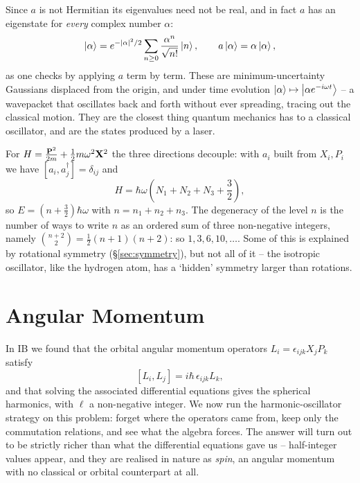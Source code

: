 \documentclass[a4paper]{scrartcl}
\begin{document}
\begin{remark}
    Since $a$ is not Hermitian its eigenvalues need not be real, and in fact $a$ has an eigenstate for \emph{every} complex number $\alpha$:
    $$
    \ket{\alpha} = e^{-\lvert\alpha\rvert^2/2}\sum_{n \geq 0}\frac{\alpha^n}{\sqrt{n!}}\ket{n}, \qquad a \ket{\alpha} = \alpha \ket{\alpha},
    $$
    as one checks by applying $a$ term by term. These  are minimum-uncertainty Gaussians displaced from the origin, and under time evolution $\ket{\alpha} \mapsto \ket{\alpha e^{-i\omega t}}$ -- a wavepacket that oscillates back and forth without ever spreading, tracing out the classical motion. They are the closest thing quantum mechanics has to a classical oscillator, and are the states produced by a laser.
\end{remark}

\begin{example}
    For $H = \frac{\mathbf{P}^2}{2m} + \frac12 m\omega^2 \mathbf{X}^2$ the three directions decouple: with $a_i$ built from $X_i, P_i$ we have $[a_i, a_j^\dagger] = \delta_{ij}$ and
    $$
    H = \hbar\omega\left( N_1 + N_2 + N_3 + \frac{3}{2} \right),
    $$
    so $E = (n + \frac32)\hbar\omega$ with $n = n_1+n_2+n_3$. The degeneracy of the level $n$ is the number of ways to write $n$ as an ordered sum of three non-negative integers, namely $\binom{n+2}{2} = \frac12(n+1)(n+2)$: so $1, 3, 6, 10, \dots$. Some of this is explained by rotational symmetry (\S\ref{sec:symmetry}), but not all of it -- the isotropic oscillator, like the hydrogen atom, has a `hidden' symmetry larger than rotations.
\end{example}

\section{Angular Momentum}\label{sec:angmom}

In IB we found that the orbital angular momentum operators $L_i = \epsilon_{ijk}X_jP_k$ satisfy
$$
[L_i, L_j] = i\hbar\,\epsilon_{ijk}L_k,
$$
and that solving the associated differential equations gives the spherical harmonics, with $\ell$ a non-negative integer. We now run the harmonic-oscillator strategy on this problem: forget where the operators came from, keep only the commutation relations, and see what the algebra forces. The answer will turn out to be strictly richer than what the differential equations gave us -- half-integer values appear, and they are realised in nature as \emph{spin}, an angular momentum with no classical or orbital counterpart at all.
\end{document}
